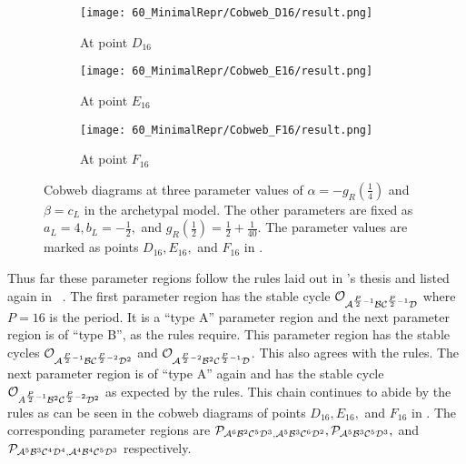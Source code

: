 \begin{figure}
	\centering
	\begin{subfigure}{0.3\textwidth}
		\centering
		\texttt{[image: 60\_MinimalRepr/Cobweb\_D16/result.png]}
		\caption{At point $D_{16}$}
		\label{fig:arch.dyn.cobweb.D}
	\end{subfigure}
	\begin{subfigure}{0.3\textwidth}
		\centering
		\texttt{[image: 60\_MinimalRepr/Cobweb\_E16/result.png]}
		\caption{At point $E_{16}$}
		\label{fig:arch.dyn.cobweb.E}
	\end{subfigure}
	\begin{subfigure}{0.3\textwidth}
		\centering
		\texttt{[image: 60\_MinimalRepr/Cobweb\_F16/result.png]}
		\caption{At point $F_{16}$}
		\label{fig:arch.dyn.cobweb.F}
	\end{subfigure}
	\caption[Cobweb diagrams of the archetypal model]{
		Cobweb diagrams at three parameter values of $\alpha = -g_R\left(\frac{1}{4}\right)$ and $\beta = c_L$ in the archetypal model.
		The other parameters are fixed as $a_L = 4, b_L = -\frac{1}{2},$ and $g_R\left(\frac{1}{2}\right) = \frac{1}{2} + \frac{1}{40}$.
		The parameter values are marked as points $D_{16}, E_{16},$ and $F_{16}$ in .
	}
	\label{fig:arch.dyn.cobwebs.2}
\end{figure}

Thus far these parameter regions follow the rules laid out in 's thesis and listed again in ~\Cite{akyuz2022}.
The first parameter region has the stable cycle $\mathcal{O}_{\mathcal{A}^{\frac{P}{2} - 1}\mathcal{B}\mathcal{C}^{\frac{P}{2} - 1}\mathcal{D}}$ where $P = 16$ is the period.
It is a ``type A'' parameter region and the next parameter region is of ``type B'', as the rules require.
This parameter region has the stable cycles $\mathcal{O}_{\mathcal{A}^{\frac{P}{2} - 1}\mathcal{B}\mathcal{C}^{\frac{P}{2} - 2}\mathcal{D}^2}$ and $\mathcal{O}_{\mathcal{A}^{\frac{P}{2} - 2}\mathcal{B}^2\mathcal{C}^{\frac{P}{2} - 1}\mathcal{D}}$.
This also agrees with the rules.
The next parameter region is of ``type A'' again and has the stable cycle $\mathcal{O}_{A^{\frac{P}{2} - 1}\mathcal{B}^2\mathcal{C}^{\frac{P}{2} - 2}\mathcal{D}^2}$ as expected by the rules.
This chain continues to abide by the rules as can be seen in the cobweb diagrams of points $D_{16}, E_{16},$ and $F_{16}$ in .
The corresponding parameter regions are $\mathcal{P}_{\mathcal{A}^6\mathcal{B}^2\mathcal{C}^5\mathcal{D}^3, \mathcal{A}^5\mathcal{B}^3\mathcal{C}^6\mathcal{D}^2}, \mathcal{P}_{\mathcal{A}^5\mathcal{B}^3\mathcal{C}^5\mathcal{D}^3},$ and $\mathcal{P}_{\mathcal{A}^5\mathcal{B}^3\mathcal{C}^4\mathcal{D}^4, \mathcal{A}^4\mathcal{B}^4\mathcal{C}^5\mathcal{D}^3}$ respectively.


